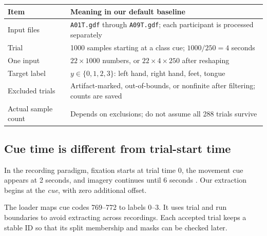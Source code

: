 \documentclass[11pt,a4paper]{article}
\newcommand{\code}[1]{{\small\nolinkurl{#1}}}
\begin{document}
\begin{tabularx}{\linewidth}{@{}L{42mm}Y@{}}
\toprule
Item & Meaning in our default baseline \\
\midrule
Input files & \code{A01T.gdf} through \code{A09T.gdf}; each participant is processed separately \\
Trial & 1000 samples starting at a class cue; $1000/250=4$ seconds \\
One input & $22\times1000$ numbers, or $22\times4\times250$ after reshaping \\
Target label & $y\in\{0,1,2,3\}$: left hand, right hand, feet, tongue \\
Excluded trials & Artifact-marked, out-of-bounds, or nonfinite after filtering; counts are saved \\
Actual sample count & Depends on exclusions; do not assume all 288 trials survive \\
\bottomrule
\end{tabularx}

\subsection*{Cue time is different from trial-start time}
In the recording paradigm, fixation starts at trial time 0, the movement cue
appears at 2 seconds, and imagery continues until 6 seconds \cite{dataset}.
Our extraction begins at the \emph{cue}, with zero additional offset.

\begin{center}
\end{center}
The loader maps cue codes 769--772 to labels 0--3. It uses trial and run
boundaries to avoid extracting across recordings. Each accepted trial keeps a
stable ID so that its split membership and masks can be checked later.
\end{document}
